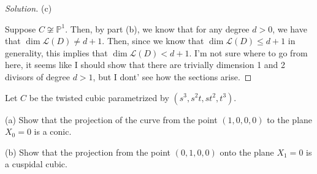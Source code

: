 \documentclass[10pt]{article}
\newenvironment{problem}[2][Problem]{\begin{trivlist}
\item[\hskip \labelsep {\bfseries #1}\hskip \labelsep {\bfseries #2.}]}{\end{trivlist}}
\begin{document}
\begin{proof}[Solution]
(c)

Suppose $C \not \cong \mathbb{P}^1$. Then, by part (b), we know that for any degree $d > 0$, we have that $\dim \mathcal{L}(D) \not = d + 1$. Then, since we know that $\dim \mathcal{L}(D) \leq d + 1$ in generality, this implies that $\dim \mathcal{L}(D) < d+1$. I’m not sure where to go from here, it seems like I should show that there are trivially dimension 1 and 2 divisors of degree $d > 1$, but I dont’ see how the sections arise.

\end{proof}

\begin{problem}{10.3}

Let $C$ be the twisted cubic parametrized by $(s^3, s^2t, st^2, t^3)$.

(a) Show that the projection of the curve from the point $(1,0,0,0)$ to the plane $X_0 = 0$ is a conic.

(b) Show that the projection from the point $(0,1,0,0)$ onto the plane $X_1 = 0$ is a cuspidal cubic.

\end{problem}
\end{document}
